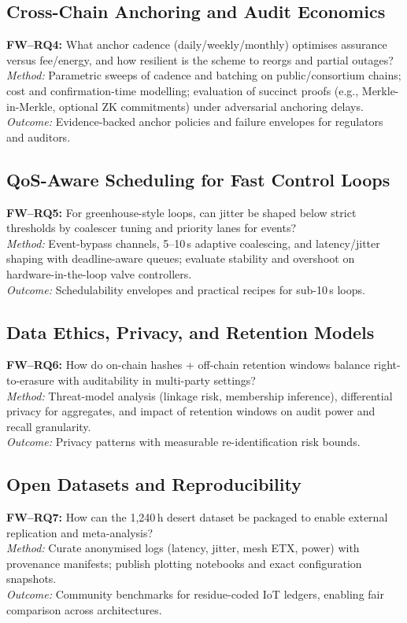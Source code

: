 \documentclass[12pt,onecolumn]{IEEEtran} %
\begin{document}
\subsection{Cross-Chain Anchoring and Audit Economics}
\textbf{FW–RQ4:} What anchor cadence (daily/weekly/monthly) optimises assurance versus fee/energy, and how resilient is the scheme to reorgs and partial outages? \\
\textit{Method:} Parametric sweeps of cadence and batching on public/consortium chains; cost and confirmation-time modelling; evaluation of succinct proofs (e.g., Merkle-in-Merkle, optional ZK commitments) under adversarial anchoring delays. \\
\textit{Outcome:} Evidence-backed anchor policies and failure envelopes for regulators and auditors.

\subsection{QoS-Aware Scheduling for Fast Control Loops}
\textbf{FW–RQ5:} For greenhouse-style loops, can jitter be shaped below strict thresholds by coalescer tuning and priority lanes for events? \\
\textit{Method:} Event-bypass channels, 5–10\,s adaptive coalescing, and latency/jitter shaping with deadline-aware queues; evaluate stability and overshoot on hardware-in-the-loop valve controllers. \\
\textit{Outcome:} Schedulability envelopes and practical recipes for sub-10\,s loops.

\subsection{Data Ethics, Privacy, and Retention Models}
\textbf{FW–RQ6:} How do on-chain hashes + off-chain retention windows balance right-to-erasure with auditability in multi-party settings? \\
\textit{Method:} Threat-model analysis (linkage risk, membership inference), differential privacy for aggregates, and impact of retention windows on audit power and recall granularity. \\
\textit{Outcome:} Privacy patterns with measurable re-identification risk bounds.

\subsection{Open Datasets and Reproducibility}
\textbf{FW–RQ7:} How can the 1{,}240\,h desert dataset be packaged to enable external replication and meta-analysis? \\
\textit{Method:} Curate anonymised logs (latency, jitter, mesh ETX, power) with provenance manifests; publish plotting notebooks and exact configuration snapshots. \\
\textit{Outcome:} Community benchmarks for residue-coded IoT ledgers, enabling fair comparison across architectures.
\end{document}
